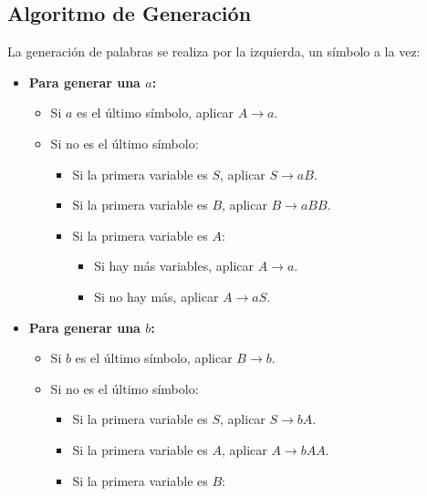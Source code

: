 \documentclass[12pt]{book} %
\providecommand{\tightlist}{%
  \setlength{\itemsep}{0pt}\setlength{\parskip}{0pt}}
\begin{document}
\hypertarget{algoritmo-de-generaciuxf3n}{%
\subsection{Algoritmo de Generación}\label{algoritmo-de-generaciuxf3n}}

La generación de palabras se realiza por la izquierda, un símbolo a la
vez:

\begin{itemize}
\tightlist
\item
  \textbf{Para generar una \(a\):}

  \begin{itemize}
  \tightlist
  \item
    Si \(a\) es el último símbolo, aplicar \(A \to a\).\\
  \item
    Si no es el último símbolo:

    \begin{itemize}
    \tightlist
    \item
      Si la primera variable es \(S\), aplicar \(S \to aB\).\\
    \item
      Si la primera variable es \(B\), aplicar \(B \to aBB\).\\
    \item
      Si la primera variable es \(A\):

      \begin{itemize}
      \tightlist
      \item
        Si hay más variables, aplicar \(A \to a\).\\
      \item
        Si no hay más, aplicar \(A \to aS\).
      \end{itemize}
    \end{itemize}
  \end{itemize}
\item
  \textbf{Para generar una \(b\):}

  \begin{itemize}
  \tightlist
  \item
    Si \(b\) es el último símbolo, aplicar \(B \to b\).\\
  \item
    Si no es el último símbolo:

    \begin{itemize}
    \tightlist
    \item
      Si la primera variable es \(S\), aplicar \(S \to bA\).\\
    \item
      Si la primera variable es \(A\), aplicar \(A \to bAA\).\\
    \item
      Si la primera variable es \(B\):


\end{itemize}
\end{itemize}
\end{itemize}
\end{document}
